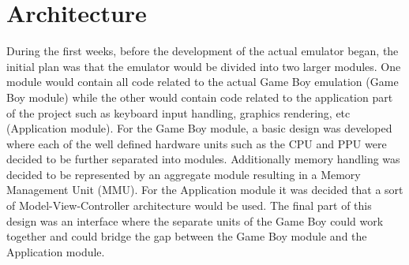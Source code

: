 \section{Architecture}
During the first weeks, before the development of the actual emulator began, the initial plan was that the emulator would be divided into two larger modules. One module would contain all code related to the actual Game Boy emulation (Game Boy module) while the other would contain code related to the application part of the project such as keyboard input handling, graphics rendering, etc (Application module). For the Game Boy module, a basic design was developed where each of the well defined hardware units such as the CPU and PPU were decided to be further separated into modules. Additionally memory handling was decided to be represented by an aggregate module resulting in a Memory Management Unit (MMU). For the Application module it was decided that a sort of Model-View-Controller architecture would be used. The final part of this design was an interface where the separate units of the Game Boy could work together and could bridge the gap between the Game Boy module and the Application module.

